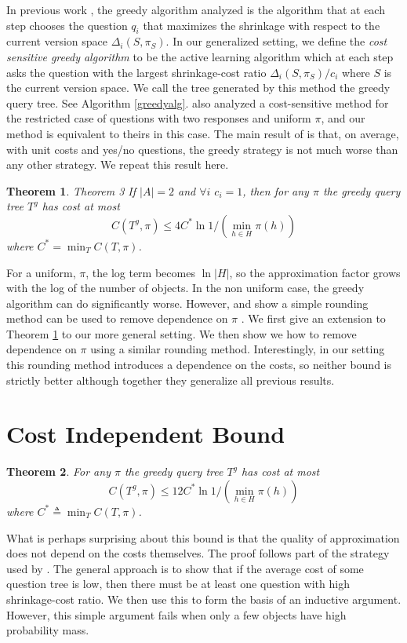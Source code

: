 \documentclass{article}
\newtheorem{theorem}{Theorem}
\begin{document}
In previous work \citep{greedy, approxoptimal, 
decisiontreesentity}, 
the greedy algorithm analyzed is the algorithm that
at each step chooses the question $q_i$ that maximizes the shrinkage
with respect to the current version space $\Delta_i(S, \pi_S)$.  In
our generalized setting, we define the \emph{cost sensitive greedy
  algorithm} to be the active learning algorithm which at each step
asks the question with the largest shrinkage-cost ratio $\Delta_i(S,
\pi_S) / c_i$ where $S$ is the current version space.  We call the
tree generated by this method the greedy query tree.  See Algorithm
\ref{greedyalg}.  \citet{approxoptimal} also analyzed a cost-sensitive
method for the restricted case of 
questions with two responses and uniform $\pi$, and our
method is equivalent to theirs in this case.  The main result of
\citet{greedy} is that, on average, with unit costs and yes/no
questions, the greedy strategy is not much worse than any other
strategy.  We repeat this result here.
\begin{theorem} Theorem 3 \citep{greedy}  If $|A|=2$ and  
$\forall i$ $c_i = 1$, then for any $\pi$ the greedy query tree 
$T^g$ has cost at most 
\[ C(T^g, \pi) \leq 4 C^* \ln 1/(\min_{h \in H} \pi(h)) \] where $C^*
= \min_T C(T, \pi)$. \label{oldthm} \end{theorem} 
For a uniform, 
$\pi$, the log term becomes $\ln |H|$, so the approximation factor
grows with the log of the number of objects.  In the non uniform case,
the greedy algorithm can do significantly worse.  However,
\citet{optimalsplit} and \citet{decisiontreesentity} show a simple
rounding method can be used to remove dependence on $\pi$ .  We first
give an extension to Theorem \ref{oldthm} to our more general setting.
We then show we how to remove dependence on $\pi$ using a similar
rounding method.  Interestingly, in our setting this rounding method
introduces a dependence on the costs, so neither bound is strictly
better although together they generalize all previous results.

\section{Cost Independent Bound}
\begin{theorem}
For any $\pi$ the greedy query tree $T^g$ has cost 
at most 
\[ C(T^g, \pi) \leq 12 C^* \ln 1/(\min_{h \in H} \pi(h)) \]
where $C^* \triangleq \min_T C(T, \pi)$. \label{mainthm} \end{theorem}
What is perhaps surprising about this bound is that the quality of
approximation does not depend on the costs themselves. 
The proof follows part of the strategy used by \citet{greedy}.  The general
approach is to show that if the average cost of some question
tree is low, then there must be at least one question with
high shrinkage-cost ratio.  We then use this to
form the basis of an inductive argument.  However, 
this simple argument fails when only a few objects have high probability mass.
\end{document}
